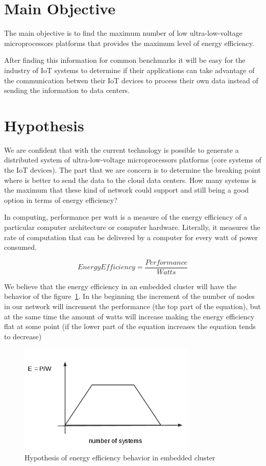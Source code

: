 \section{Main Objective}
\noindent

The main objective is to find the maximum number of low ultra-low-voltage
microprocessors platforms that provides the maximum level of energy efficiency.

After finding this information for common benchmarks it will be easy for the
industry of IoT systems to determine if their applications can take advantage
of the communication betwen their IoT devices to process their own data instead
of sending the information to data centers.

\section{Hypothesis}
\noindent

We are confident that with the current technology is possible to generate a
distributed system of ultra-low-voltage microprocessors platforms (core
systems of the IoT devices). The part that we are concern is to determine the
breaking point where is better to send the data to the cloud data centers. How
many systems is the maximum that these kind of network could support and still
being a good option in terms of energy efficiency?

In computing, performance per watt is a measure of the energy efficiency of a
particular computer architecture or computer hardware. Literally, it measures
the rate of computation that can be delivered by a computer for every watt of
power consumed.\cite{Burd} 


\begin{equation}
    Energy Efficiency = \dfrac {Performance}{Watts}
\end{equation}

We believe that the energy efficiency in an embedded cluster will have the
behavior of the  figure~\ref{fig:1.2}. In the beginning the increment of the
number of nodes in our network will increment the performance (the top part of
the equation), but at the same time the amount of watts will
increase making the energy efficiency flat at some point (if the lower part of
the equation increases the equation tends to decrease)


\begin{figure}[H]
\centering
\includegraphics[width=0.75\textwidth]{images/graph_1.png}
\caption{Hypothesis of energy efficiency behavior in embedded cluster}
\label{fig:1.2}
\end{figure}

